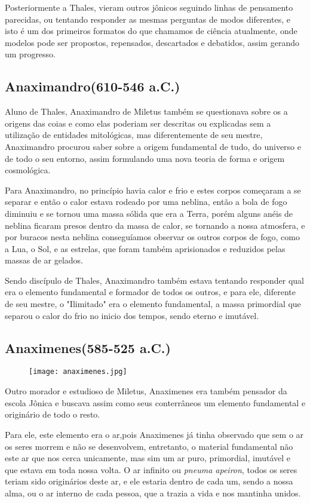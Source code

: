 Posteriormente a Thales, vieram outros jônicos seguindo linhas de pensamento parecidas, ou tentando responder as mesmas perguntas de modos diferentes, e isto é um dos primeiros formatos do que chamamos de ciência atualmente, onde modelos pode ser propostos, repensados, descartados e debatidos, assim gerando um progresso.
\subsection*{Anaximandro(610-546 a.C.)}
Aluno de Thales, Anaximandro de Miletus também se questionava sobre os a origens das coias e como elas poderiam ser descritas ou explicadas sem a utilização de entidades mitológicas, mas diferentemente de seu mestre, Anaximandro procurou saber sobre a origem fundamental de tudo, do universo e de todo o seu entorno, assim formulando uma nova teoria de forma e origem cosmológica.

Para Anaximandro, no princípio havia calor e frio e estes corpos começaram a se separar e então o calor estava rodeado por uma neblina, então a bola de fogo diminuiu e se tornou uma massa sólida que era a Terra, porém alguns anéis de neblina ficaram presos dentro da massa de calor, se tornando a nossa atmosfera, e por buracos nesta neblina conseguíamos observar os outros corpos de fogo, como a Lua, o Sol, e as estrelas, que foram também aprisionados e reduzidos pelas massas de ar gelados.

Sendo discípulo de Thales, Anaximandro também estava tentando responder qual era o elemento fundamental e formador de todos os outros, e para ele, diferente de seu mestre, o "Ilimitado" era o elemento fundamental, a massa primordial que separou o calor do frio no inicio dos tempos, sendo eterno e imutável.

\subsection*{Anaximenes(585-525 a.C.)}
\begin{figure}[!htb]
	\centering
	\texttt{[image: anaximenes.jpg]}
	
\end{figure}
Outro morador e estudioso de Miletus, Anaximenes era também pensador da escola Jônica e buscava assim como seus conterrâneos um elemento fundamental e originário de todo o resto.

Para ele, este elemento era o ar,pois Anaximenes já tinha observado que sem o ar os seres morrem e não se desenvolvem, entretanto, o material fundamental não este ar que nos cerca unicamente, mas sim um ar puro, primordial, imutável e que estava em toda nossa volta. O ar infinito ou {\it pneuma apeiron}, todos os seres teriam sido originários deste ar, e ele estaria dentro de cada um, sendo a nossa alma, ou o ar interno de cada pessoa, que a trazia a vida e nos mantinha unidos.

